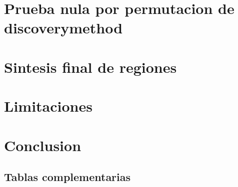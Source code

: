\documentclass[11pt]{article}
\begin{document}
\section{Prueba nula por permutacion de discoverymethod}

\section{Sintesis final de regiones}

\section{Limitaciones}

\section{Conclusion}

\FloatBarrier
\clearpage
\begin{landscape}
\section*{Tablas complementarias}

\end{landscape}
\end{document}
